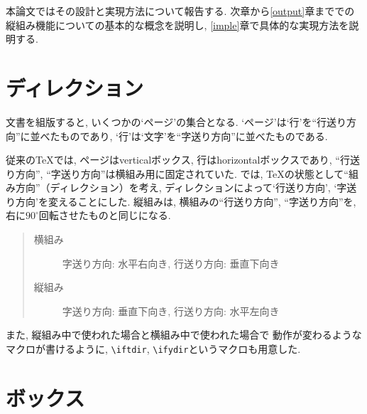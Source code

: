 本論文ではその設計と実現方法について報告する.
次章から\ref{output}章までで\pTeX の縦組み機能についての基本的な概念を説明し,
\ref{imple}章で具体的な実現方法を説明する.


\section{ディレクション} \label{direction}

文書を組版すると, いくつかの`ページ'の集合となる.
`ページ'は`行'を``行送り方向''に並べたものであり,
`行'は`文字'を``字送り方向''に並べたものである.

従来の\TeX では, ページはverticalボックス, 行はhorizontalボックスであり,
``行送り方向'', ``字送り方向''は横組み用に固定されていた.
\pTeX では, \TeX の状態として``組み方向''（ディレクション）を考え,
ディレクションによって`行送り方向', `字送り方向'を変えることにした.
縦組みは, 横組みの``行送り方向'', ``字送り方向''を,
右に$90^\circ$回転させたものと同じになる.
\begin{quote} \begin{description}
\item[横組み] 字送り方向: 水平右向き, 行送り方向: 垂直下向き
\item[縦組み] 字送り方向: 垂直下向き, 行送り方向: 水平左向き
\end{description} \end{quote}

また, 縦組み中で使われた場合と横組み中で使われた場合で
動作が変わるようなマクロが書けるように,
\verb|\iftdir|, \verb|\ifydir|というマクロも用意した.



\section{ボックス}

